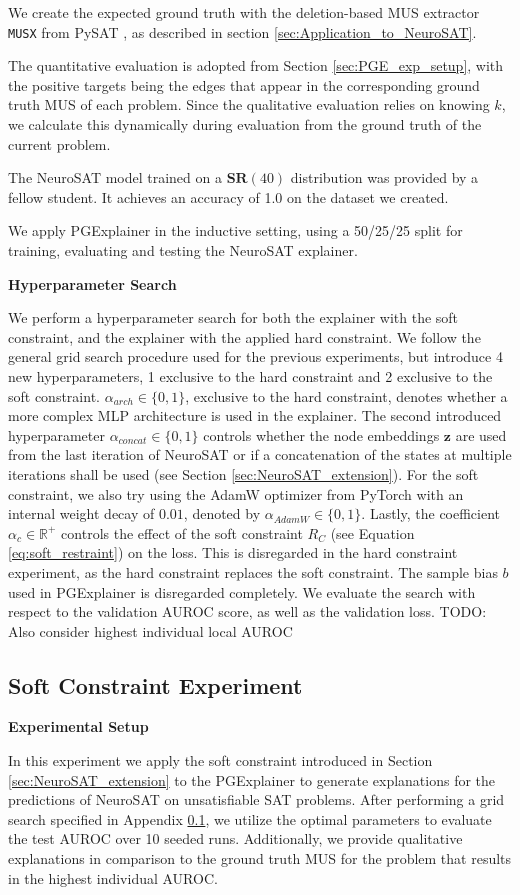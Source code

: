 We create the expected ground truth with the deletion-based MUS extractor \lstinline|MUSX| from PySAT \cite{imms-sat18}, as described in section \ref{sec:Application_to_NeuroSAT}.

The quantitative evaluation is adopted from Section \ref{sec:PGE_exp_setup}, with the positive targets being the edges that appear in the corresponding ground truth MUS of each problem. Since the qualitative evaluation relies on knowing $k$, we calculate this dynamically during evaluation from the ground truth of the current problem.

The NeuroSAT model trained on a $\textbf{SR}(40)$ distribution was provided by a fellow student. It achieves an accuracy of 1.0 on the dataset we created.

We apply PGExplainer in the inductive setting, using a 50/25/25 split for training, evaluating and testing the NeuroSAT explainer. \bigskip

\textbf{Hyperparameter Search}\par
We perform a hyperparameter search for both the explainer with the soft constraint, and the explainer with the applied hard constraint. We follow the general grid search procedure used for the previous experiments, but introduce 4 new hyperparameters, 1 exclusive to the hard constraint and 2 exclusive to the soft constraint. $\alpha_{arch} \in \{0,1\}$, exclusive to the hard constraint, denotes whether a more complex MLP architecture is used in the explainer. The second introduced hyperparameter $\alpha_{concat} \in \{0,1\}$ controls whether the node embeddings $\mathbf{z}$ are used from the last iteration of NeuroSAT or if a concatenation of the states at multiple iterations shall be used (see Section \ref{sec:NeuroSAT_extension}). For the soft constraint, we also try using the AdamW \cite{loshchilov2017decoupled} optimizer from PyTorch with an internal weight decay of $0.01$, denoted by $\alpha_{AdamW} \in \{0,1\}$. Lastly, the coefficient $\alpha_{c} \in \mathbb{R}^+$ controls the effect of the soft constraint $R_C$ (see Equation \ref{eq:soft_restraint}) on the loss. This is disregarded in the hard constraint experiment, as the hard constraint replaces the soft constraint. The sample bias $b$ used in PGExplainer is disregarded completely. We evaluate the search with respect to the validation AUROC score, as well as the validation loss. TODO: Also consider highest individual local AUROC


\subsection{Soft Constraint Experiment}
\textbf{Experimental Setup}\par
In this experiment we apply the soft constraint introduced in Section \ref{sec:NeuroSAT_extension} to the PGExplainer to generate explanations for the predictions of NeuroSAT on unsatisfiable SAT problems. After performing a grid search specified in Appendix \ref{}, we utilize the optimal parameters to evaluate the test AUROC over 10 seeded runs. Additionally, we provide qualitative explanations in comparison to the ground truth MUS for the problem that results in the highest individual AUROC. \bigskip

